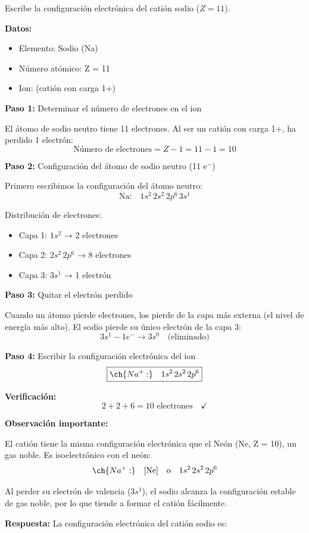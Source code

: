 \begin{exercise}
    Escribe la configuración electrónica del catión sodio  (\( Z = 11 \)).
    \begin{solu}
        \textbf{Datos:}
        \begin{itemize}
            \item Elemento: Sodio (Na)
            \item Número atómico: Z = 11
            \item Ion:  (catión con carga 1+)
        \end{itemize}

        \textbf{Paso 1:} Determinar el número de electrones en el ion

        El átomo de sodio neutro tiene 11 electrones. Al ser un catión con carga 1+, ha perdido 1 electrón:
        \[
            \text{Número de electrones} = Z - 1 = 11 - 1 = 10
        \]

        \textbf{Paso 2:} Configuración del átomo de sodio neutro (11 e\(^-\))

        Primero escribimos la configuración del átomo neutro:
        \[
            \text{Na:} \quad 1s^2 \, 2s^2 \, 2p^6 \, 3s^1
        \]

        Distribución de electrones:
        \begin{itemize}
            \item Capa 1: \(1s^2\) → 2 electrones
            \item Capa 2: \(2s^2 \, 2p^6\) → 8 electrones
            \item Capa 3: \(3s^1\) → 1 electrón
        \end{itemize}

        \textbf{Paso 3:} Quitar el electrón perdido

        Cuando un átomo pierde electrones, los pierde de la capa más externa (el nivel de energía más alto). El sodio pierde su único electrón de la capa 3:
        \[
            3s^1 - 1e^- \rightarrow 3s^0 \quad \text{(eliminado)}
        \]

        \textbf{Paso 4:} Escribir la configuración electrónica del ion
        \[
            \boxed{\ch{Na^{+}:} \quad 1s^2 \, 2s^2 \, 2p^6}
        \]

        \textbf{Verificación:}
        \[
            2 + 2 + 6 = 10 \text{ electrones} \quad \checkmark
        \]

        \textbf{Observación importante:}

        El catión  tiene la misma configuración electrónica que el Neón (Ne, Z = 10), un gas noble. Es isoelectrónico con el neón:
        \[
            \ch{Na^{+}:} \quad [\text{Ne}] \quad \text{o} \quad 1s^2 \, 2s^2 \, 2p^6
        \]

        Al perder su electrón de valencia (\(3s^1\)), el sodio alcanza la configuración estable de gas noble, por lo que tiende a formar el catión  fácilmente.

        \textbf{Respuesta:} La configuración electrónica del catión sodio es: 
    \end{solu}
\end{exercise}
